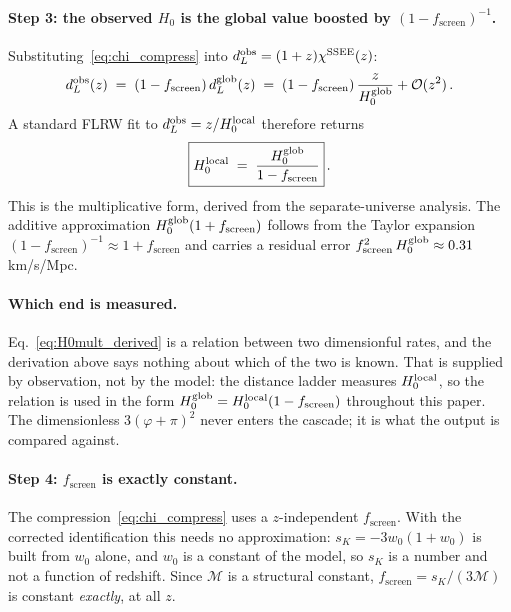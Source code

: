 \documentclass[12pt,a4paper]{article}
\newcommand{\phiG}{\varphi}
\newcommand{\MIRA}{\mathcal{M}}
\newcommand{\fsc}{f_{\mathrm{screen}}}
\newcommand{\sK}{s_K}          %
\begin{document}
\paragraph{Step 3: the observed $H_0$ is the global value boosted by $(1-\fsc)^{-1}$.}

Substituting~\eqref{eq:chi_compress} into $d_L^{\rm obs} = (1+z)\chi^{\rm SSEE}(z)$:
\begin{equation}
  d_L^{\rm obs}(z) \;=\; (1-\fsc)\,d_L^{\rm glob}(z)
                   \;=\; (1-\fsc)\,\frac{z}{H_0^{\rm glob}}
                         + \mathcal{O}(z^2)\,.
  \label{eq:dL_SSEE}
\end{equation}
A standard FLRW fit to $d_L^{\rm obs} = z/H_0^{\rm local}$ therefore returns
\begin{equation}
  \boxed{H_0^{\rm local} \;=\; \frac{H_0^{\rm glob}}{1-\fsc}}\,.
  \label{eq:H0mult_derived}
\end{equation}
This is the multiplicative form, derived from the separate-universe analysis.
The additive approximation $H_0^{\rm glob}(1+\fsc)$ follows from the
Taylor expansion $(1-\fsc)^{-1}\approx 1+\fsc$ and carries a residual
error $\fsc^2\,H_0^{\rm glob} \approx 0.31$\,km/s/Mpc.

\paragraph{Which end is measured.}
Eq.~\eqref{eq:H0mult_derived} is a relation between two dimensionful rates,
and the derivation above says nothing about which of the two is known. That is
supplied by observation, not by the model: the distance ladder measures
$H_0^{\rm local}$, so the relation is used in the form
$H_0^{\rm glob} = H_0^{\rm local}(1-\fsc)$ throughout this paper. The
dimensionless $3(\phiG+\pi)^2$ never enters the cascade; it is what the output
is compared against.

\paragraph{Step 4: $\fsc$ is exactly constant.}
\label{sec:step4}

The compression~\eqref{eq:chi_compress} uses a $z$-independent $\fsc$.  With
the corrected identification this needs no approximation: $\sK = -3w_0(1+w_0)$
is built from $w_0$ alone, and $w_0$ is a constant of the model, so $\sK$ is a
number and not a function of redshift.  Since $\MIRA$ is a structural
constant, $\fsc = \sK/(3\MIRA)$ is constant \emph{exactly}, at all $z$.
\end{document}
